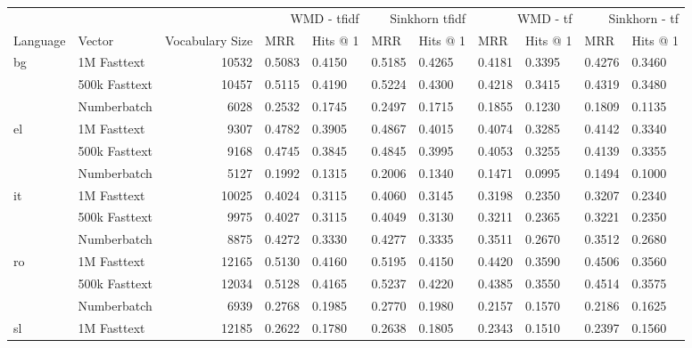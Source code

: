 \begin{table}[]
\begin{tabular}{@{}lllllllllll@{}}
 &  &  & \multicolumn{2}{r}{WMD - tfidf} & \multicolumn{2}{r}{Sinkhorn tfidf} & \multicolumn{2}{r}{WMD - tf} & \multicolumn{2}{r}{Sinkhorn - tf} \\
Language & Vector & \multicolumn{1}{r}{Vocabulary Size} & MRR & Hits @ 1 & MRR & Hits @ 1 & MRR & Hits @ 1 & MRR & Hits @ 1 \\
\multirow{3}{*}{bg} & 1M Fasttext & \multicolumn{1}{r}{10532} & 0.5083 & 0.4150 & 0.5185 & 0.4265 & 0.4181 & 0.3395 & 0.4276 & 0.3460 \\
 & 500k Fasttext & \multicolumn{1}{r}{10457} & 0.5115 & 0.4190 & 0.5224 & 0.4300 & 0.4218 & 0.3415 & 0.4319 & 0.3480 \\
 & Numberbatch & \multicolumn{1}{r}{6028} & 0.2532 & 0.1745 & 0.2497 & 0.1715 & 0.1855 & 0.1230 & 0.1809 & 0.1135 \\
\multirow{3}{*}{el} & 1M Fasttext & \multicolumn{1}{r}{9307} & 0.4782 & 0.3905 & 0.4867 & 0.4015 & 0.4074 & 0.3285 & 0.4142 & 0.3340 \\
 & 500k Fasttext & \multicolumn{1}{r}{9168} & 0.4745 & 0.3845 & 0.4845 & 0.3995 & 0.4053 & 0.3255 & 0.4139 & 0.3355 \\
 & Numberbatch & \multicolumn{1}{r}{5127} & 0.1992 & 0.1315 & 0.2006 & 0.1340 & 0.1471 & 0.0995 & 0.1494 & 0.1000 \\
\multirow{3}{*}{it} & 1M Fasttext & \multicolumn{1}{r}{10025} & 0.4024 & 0.3115 & 0.4060 & 0.3145 & 0.3198 & 0.2350 & 0.3207 & 0.2340 \\
 & 500k Fasttext & \multicolumn{1}{r}{9975} & 0.4027 & 0.3115 & 0.4049 & 0.3130 & 0.3211 & 0.2365 & 0.3221 & 0.2350 \\
 & Numberbatch & \multicolumn{1}{r}{8875} & 0.4272 & 0.3330 & 0.4277 & 0.3335 & 0.3511 & 0.2670 & 0.3512 & 0.2680 \\
\multirow{3}{*}{ro} & 1M Fasttext & \multicolumn{1}{r}{12165} & 0.5130 & 0.4160 & 0.5195 & 0.4150 & 0.4420 & 0.3590 & 0.4506 & 0.3560 \\
 & 500k Fasttext & \multicolumn{1}{r}{12034} & 0.5128 & 0.4165 & 0.5237 & 0.4220 & 0.4385 & 0.3550 & 0.4514 & 0.3575 \\
 & Numberbatch & \multicolumn{1}{r}{6939} & 0.2768 & 0.1985 & 0.2770 & 0.1980 & 0.2157 & 0.1570 & 0.2186 & 0.1625 \\
\multirow{3}{*}{sl} & 1M Fasttext & \multicolumn{1}{r}{12185} & 0.2622 & 0.1780 & 0.2638 & 0.1805 & 0.2343 & 0.1510 & 0.2397 & 0.1560 \\

\end{tabular}
\end{table}

